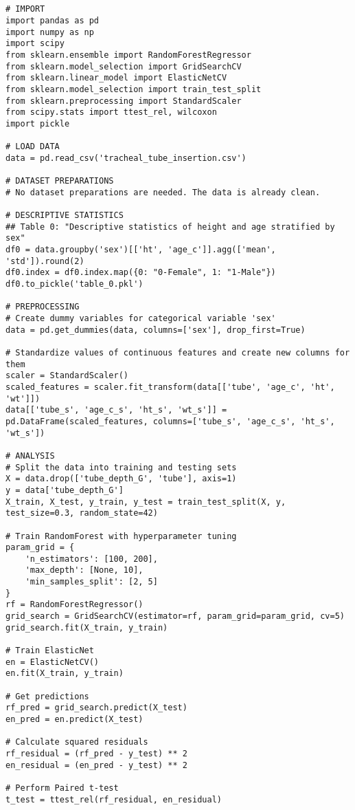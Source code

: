 \documentclass[11pt]{article}
\begin{document}
\begin{verbatim}


# IMPORT
import pandas as pd
import numpy as np
import scipy 
from sklearn.ensemble import RandomForestRegressor
from sklearn.model_selection import GridSearchCV
from sklearn.linear_model import ElasticNetCV
from sklearn.model_selection import train_test_split
from sklearn.preprocessing import StandardScaler
from scipy.stats import ttest_rel, wilcoxon
import pickle

# LOAD DATA
data = pd.read_csv('tracheal_tube_insertion.csv')

# DATASET PREPARATIONS
# No dataset preparations are needed. The data is already clean.

# DESCRIPTIVE STATISTICS
## Table 0: "Descriptive statistics of height and age stratified by sex"
df0 = data.groupby('sex')[['ht', 'age_c']].agg(['mean', 'std']).round(2)
df0.index = df0.index.map({0: "0-Female", 1: "1-Male"})
df0.to_pickle('table_0.pkl')

# PREPROCESSING
# Create dummy variables for categorical variable 'sex'
data = pd.get_dummies(data, columns=['sex'], drop_first=True)

# Standardize values of continuous features and create new columns for them
scaler = StandardScaler()
scaled_features = scaler.fit_transform(data[['tube', 'age_c', 'ht', 'wt']])
data[['tube_s', 'age_c_s', 'ht_s', 'wt_s']] = pd.DataFrame(scaled_features, columns=['tube_s', 'age_c_s', 'ht_s', 'wt_s'])

# ANALYSIS
# Split the data into training and testing sets
X = data.drop(['tube_depth_G', 'tube'], axis=1)
y = data['tube_depth_G']
X_train, X_test, y_train, y_test = train_test_split(X, y, test_size=0.3, random_state=42)

# Train RandomForest with hyperparameter tuning
param_grid = {
    'n_estimators': [100, 200],
    'max_depth': [None, 10],
    'min_samples_split': [2, 5]
}
rf = RandomForestRegressor()
grid_search = GridSearchCV(estimator=rf, param_grid=param_grid, cv=5)
grid_search.fit(X_train, y_train)

# Train ElasticNet
en = ElasticNetCV()
en.fit(X_train, y_train)

# Get predictions
rf_pred = grid_search.predict(X_test)
en_pred = en.predict(X_test)

# Calculate squared residuals
rf_residual = (rf_pred - y_test) ** 2
en_residual = (en_pred - y_test) ** 2

# Perform Paired t-test
t_test = ttest_rel(rf_residual, en_residual)


\end{verbatim}
\end{document}
